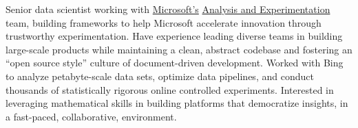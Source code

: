 \documentclass[11pt, letterpaper]{awesome-cv}
\begin{document}
\makecvheader






\begin{cvparagraph}
Senior data scientist working with \href{https://www.microsoft.com/}{Microsoft's} \href{http://www.exp-platform.com/}{Analysis and Experimentation} team, building frameworks to help Microsoft accelerate innovation through trustworthy experimentation.
Have experience leading diverse teams in building large-scale products while maintaining a clean, abstract codebase and fostering an ``open source style'' culture of document-driven development.
Worked with Bing to analyze petabyte-scale data sets, optimize data pipelines, and conduct thousands of statistically rigorous online controlled experiments.
Interested in leveraging mathematical skills in building platforms that democratize insights, in a fast-paced, collaborative, environment.
\end{cvparagraph}





\end{document}
